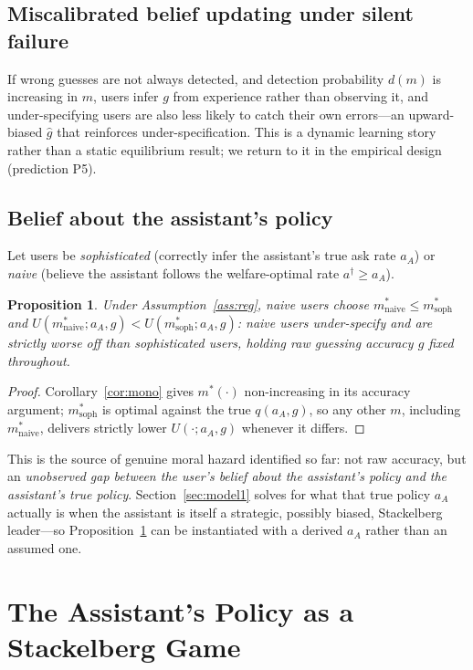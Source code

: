 \documentclass[11pt]{article}
\newtheorem{proposition}{Proposition}
\begin{document}
\subsection{Miscalibrated belief updating under silent failure}
If wrong guesses are not always detected, and detection probability $d(m)$ is
increasing in $m$, users infer $g$ from experience rather than observing it, and
under-specifying users are also less likely to catch their own errors---an
upward-biased $\hat g$ that reinforces under-specification. This is a dynamic
learning story rather than a static equilibrium result; we return to it in the
empirical design (prediction P5).

\subsection{Belief about the assistant's policy}
\label{sec:naive-soph}
Let users be \emph{sophisticated} (correctly infer the assistant's true ask rate
$a_A$) or \emph{naive} (believe the assistant follows the welfare-optimal rate
$a^\dagger \ge a_A$).

\begin{proposition}\label{prop:bias}
Under Assumption~\ref{ass:reg}, naive users choose
$m^*_{\text{naive}} \le m^*_{\text{soph}}$ and
$U(m^*_{\text{naive}};a_A,g) < U(m^*_{\text{soph}};a_A,g)$: naive users
under-specify and are strictly worse off than sophisticated users, holding raw
guessing accuracy $g$ fixed throughout.
\end{proposition}

\begin{proof}
Corollary~\ref{cor:mono} gives $m^*(\cdot)$ non-increasing in its accuracy
argument; $m^*_{\text{soph}}$ is optimal against the true $q(a_A,g)$, so any other
$m$, including $m^*_{\text{naive}}$, delivers strictly lower $U(\cdot;a_A,g)$
whenever it differs.
\end{proof}

This is the source of genuine moral hazard identified so far: not raw accuracy, but
an \emph{unobserved gap between the user's belief about the assistant's policy and
the assistant's true policy}. Section~\ref{sec:model1} solves for what that true
policy $a_A$ actually is when the assistant is itself a strategic, possibly biased,
Stackelberg leader---so Proposition~\ref{prop:bias} can be instantiated with a
derived $a_A$ rather than an assumed one.

\section{The Assistant's Policy as a Stackelberg Game}
\label{sec:stackelberg}
\end{document}
